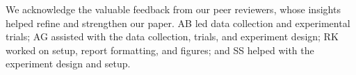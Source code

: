 \documentclass[reprint,amsmath,amssymb,aps]{revtex4-2}
\begin{document}
We acknowledge the valuable feedback from our peer reviewers, whose insights helped refine and strengthen our paper. AB led data collection and experimental trials; AG assisted with the data collection, trials, and experiment design; RK worked on setup, report formatting, and figures; and SS helped with the experiment design and setup. 
    

\end{document}
